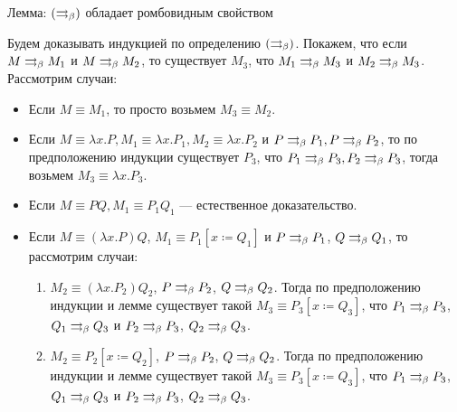 \documentclass[aspectratio=169]{beamer}
\begin{document}
\begin{frame}{Лемма: $(\rightrightarrows_{\beta})$ обладает ромбовидным свойством}

	Будем доказывать индукцией по определению $(\rightrightarrows_{\beta})$. Покажем, что если $M \rightrightarrows_{\beta} M_1$ и $M \rightrightarrows_{\beta} M_2$, то существует ${}M_3$, что $M_1 \rightrightarrows_{\beta} M_3$ и $M_2 \rightrightarrows_{\beta} M_3$. Рассмотрим случаи:
	\begin{itemize}
		\item Если $M\equiv M_1$, то просто возьмем $M_3\equiv M_2$.
		\item Если $M\equiv \lambda{}x.P, M_1 \equiv \lambda{}x.P_1, M_2 \equiv \lambda{}x.P_2$ и $P \rightrightarrows_{\beta} P_1, P \rightrightarrows_{\beta} P_2$, то по предположению индукции 
		существует $P_3$, что $P_1 \rightrightarrows_{\beta} P_3, P_2 \rightrightarrows_{\beta} P_3$, тогда возьмем $M_3\equiv \lambda{}x.P_3$.
		\item Если $M \equiv P Q, M_1 \equiv P_1 Q_1$ --- естественное доказательство.
	\item Если $ M \equiv (\lambda{}x.P)Q $, $ M_1 \equiv P_1[x\coloneqq Q_1] $ и $ P \rightrightarrows_{\beta} P_1 $, $ Q \rightrightarrows_{\beta} Q_1$, то рассмотрим случаи:
	\begin{enumerate}
		\item $ M_2 \equiv (\lambda{}x.P_2)Q_2 $, $P \rightrightarrows_{\beta} P_2$, $Q \rightrightarrows_{\beta} Q_2$. Тогда по предположению индукции и лемме существует такой $ M_3 \equiv P_3[x \coloneqq Q_3] $, что $ P_1 \rightrightarrows_{\beta} P_3 $, $ Q_1 \rightrightarrows_{\beta} Q_3 $ и $ P_2 \rightrightarrows_{\beta} P_3 $, $ Q_2 \rightrightarrows_{\beta} Q_3 $.
		\item $ M_2 \equiv P_2[x \coloneqq Q_2]$, $ P \rightrightarrows_{\beta} P_2 $, $ Q \rightrightarrows_{\beta} Q_2 $. Тогда по предположению индукции и лемме существует такой $ M_3 \equiv P_3[x \coloneqq Q_3] $, что $ P_1 \rightrightarrows_{\beta} P_3 $, $ Q_1 \rightrightarrows_{\beta} Q_3 $ и $ P_2 \rightrightarrows_{\beta} P_3 $, $ Q_2 \rightrightarrows_{\beta} Q_3 $.
	\end{enumerate}
	\end{itemize}
\end{frame}
\end{document}
